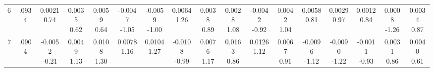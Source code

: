 \begin{landscape}
\begin{center}
{\begin{adjustbox}{max width=\textheight}
\begin{tabular}{lcccccccccccccccc}
6 & .0934 & \shortstack{0.0021\\0.74} & \shortstack{0.0035\\0.62} & \shortstack{0.0059\\0.64} & \shortstack{-0.0047\\-1.05} & \shortstack{-0.0059\\-1.00} & \shortstack{0.0064\\1.26} & \shortstack{0.0038\\0.89} & \shortstack{0.0028\\1.08} & \shortstack{-0.0042\\-0.92} & \shortstack{0.0042\\1.04} & \shortstack{0.0058\\0.81} & \shortstack{0.0029\\0.97} & \shortstack{0.0012\\0.84} & \shortstack{0.0008\\-1.26} & \shortstack{0.0034\\0.87} \\
7 & .0904 & \shortstack{-0.0052\\-0.21} & \shortstack{0.0049\\1.13} & \shortstack{0.0108\\1.30} & \shortstack{0.0078\\1.16} & \shortstack{0.0104\\1.27} & \shortstack{-0.0108\\-0.99} & \shortstack{0.0076\\1.17} & \shortstack{0.0163\\0.86} & \shortstack{0.0126\\1.12} & \shortstack{0.0067\\0.91} & \shortstack{-0.0096\\-1.12} & \shortstack{-0.0090\\-1.22} & \shortstack{-0.0011\\-0.93} & \shortstack{0.0031\\0.86} & \shortstack{0.0040\\0.61} \\

\end{tabular}
\end{adjustbox}}
\end{center}
\end{landscape}
